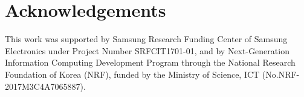 \documentclass[letterpaper]{article} %
\begin{document}
\section*{Acknowledgements}

This work was supported by Samsung Research Funding
Center of Samsung Electronics under Project Number SRFCIT1701-01, and by Next-Generation Information Computing Development Program through the National Research Foundation of Korea (NRF), funded by the Ministry of Science, ICT (No.NRF-2017M3C4A7065887).



\end{document}
